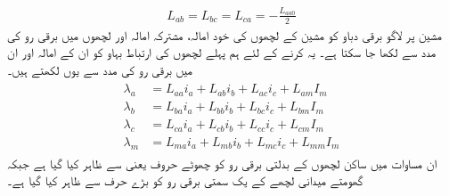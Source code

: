 \begin{align}\label{مساوات_معاصر_ساکن_مشترکہ_امالہ}
L_{ab}=L_{bc}=L_{ca}=-\frac{L_{aa0}}{2}
\end{align}
%
مشین پر لاگو برقی دباو کو مشین کے لچھوں کی خود امالہ، مشترکہ امالہ اور لچھوں میں برقی رو کی مدد سے لکھا جا سکتا ہے۔ یہ کرنے کے لئے ہم پہلے  لچھوں کی ارتباط بہاو  کو ان کے امالہ اور ان میں برقی رو کی مدد سے یوں لکھتے ہیں۔
\begin{gather}
\begin{aligned}
\lambda_a&=L_{aa} i_a+L_{ab} i_b +L_{ac} i_c+L_{am} I_m\\
\lambda_b&=L_{ba} i_a+L_{bb} i_b +L_{bc} i_c+L_{bm} I_m\\
\lambda_c&=L_{ca} i_a+L_{cb} i_b +L_{cc} i_c+L_{cm} I_m\\
\lambda_m&=L_{ma} i_a+L_{mb} i_b +L_{mc} i_c+L_{mm} I_m
\end{aligned}
\end{gather}
ان مساوات میں ساکن لچھوں کے بدلتی برقی رو  کو چھوٹے حروف یعنی  سے ظاہر کیا گیا ہے جبکہ گھومتے میدانی لچھے کے یک سمتی برقی رو کو بڑے حرف   سے ظاہر کیا گیا ہے۔

